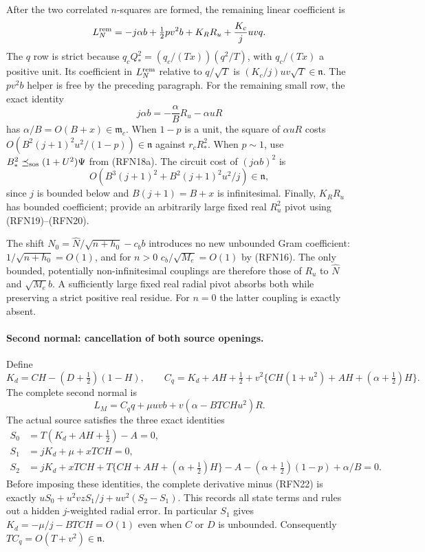 After the two correlated $n$-squares are formed, the remaining linear
coefficient is
\[
 L_N^{\rm rem}=-j\alpha b+\tfrac12pv^2b
                       +K_RR_u+\frac{K_c}{j}uvq.
\]
The $q$ row is strict because
$q_cQ_*^2=(q_c/(Tx))(q^2/T)$, with $q_c/(Tx)$ a positive unit.
Its coefficient in $L_N^{\rm rem}$ relative to $q/\sqrt T$ is
$(K_c/j)uv\sqrt T\in\mathfrak n$.
The $pv^2b$ helper is free by the preceding paragraph.
For the remaining small row, the exact identity
\[
 j\alpha b=-\frac\alpha B R_u-\alpha uR
\]
has $\alpha/B=O(B+x)\in\mathfrak m_c$.
When $1-p$ is a unit, the square of $\alpha uR$ costs
$O(B^2(j+1)^2u^2/(1-p))\in\mathfrak n$ against $r_cR_*^2$.
When $p\sim1$, use $B_*^2\preceq_{\rm sos}(1+U^2)\Psi$ from
(RFN18a).  The circuit cost of $(j\alpha b)^2$ is
\[
 O\!\left(B^3(j+1)^2+B^2(j+1)^2u^2/j\right)\in\mathfrak n,
\]
since $j$ is bounded below and $B(j+1)=B+x$ is infinitesimal.
Finally, $K_RR_u$ has bounded coefficient; provide an arbitrarily large
fixed real $R_u^2$ pivot using (RFN19)--(RFN20).

The shift $N_0=\widehat N/\sqrt{n+h_0}-c_bb$ introduces no new
unbounded Gram coefficient: $1/\sqrt{n+h_0}=O(1)$, and for $n>0$
$c_b/\sqrt{M_e}=O(1)$ by (RFN16).  The only bounded, potentially
non-infinitesimal couplings are therefore those of $R_u$ to
$\widehat N$ and $\sqrt{M_e}b$.  A sufficiently large fixed real radial
pivot absorbs both while preserving a strict positive real residue.
For $n=0$ the latter coupling is exactly absent.

\paragraph{Second normal: cancellation of both source openings.}
Define
\[
 K_d=CH-(D+\tfrac12)(1-H),\qquad
 C_q=K_d+AH+\tfrac12
       +v^2\{CH(1+u^2)+AH+(\alpha+\tfrac12)H\}.
\]
The complete second normal is
\[
 L_M=C_q q+\mu uvb+v(\alpha-BTCHu^2)R.                  \tag{RFN22}
\]
The actual source satisfies the three exact identities
\[
\begin{split}
 S_0&=T(K_d+AH+\tfrac12)-A=0,\\
 S_1&=jK_d+\mu+xTCH=0,\\
 S_2&=jK_d+xTCH+T\{CH+AH+(\alpha+\tfrac12)H\}
          -A-(\alpha+\tfrac12)(1-p)+\alpha/B=0.
\end{split}
\]
Before imposing these identities, the complete derivative minus
(RFN22) is exactly
$uS_0+u^2vzS_1/j+uv^2(S_2-S_1)$.
This records all state terms and rules out a hidden $j$-weighted
radial error.  In particular $S_1$ gives
$K_d=-\mu/j-BTCH=O(1)$ even when $C$ or $D$ is unbounded.
Consequently $TC_q=O(T+v^2)\in\mathfrak n$.

